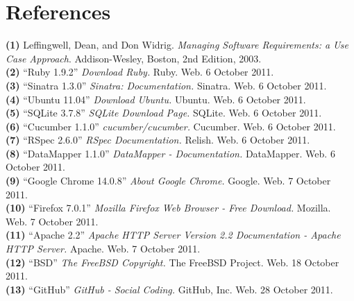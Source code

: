 \documentclass{article}
\begin{document}
\section{References}
\hangindent=1.4cm
\textbf{(1)} Leffingwell, Dean, and Don Widrig.
\emph{Managing Software Requirements: a Use Case Approach}.
Addison-Wesley, Boston,
2nd Edition,
2003.\\

\noindent\hangindent=1.4cm
\textbf{(2)} ``Ruby 1.9.2''
\emph{Download Ruby.} Ruby. Web.  6 October 2011. \\

\noindent\hangindent=1.4cm
\textbf{(3)} ``Sinatra 1.3.0''
\emph{Sinatra: Documentation.} Sinatra. Web.  6 October 2011.\\

\noindent\hangindent=1.4cm
\textbf{(4)} ``Ubuntu 11.04''
\emph{Download Ubuntu.} Ubuntu. Web.  6 October 2011.\\

\noindent\hangindent=1.4cm
\textbf{(5)} ``SQLite 3.7.8''
\emph{SQLite Download Page.} SQLite. Web.  6 October 2011.\\

\noindent\hangindent=1.4cm
\textbf{(6)} ``Cucumber 1.1.0''
\emph{cucumber/cucumber.} Cucumber. Web.  6 October 2011.\\

\noindent\hangindent=1.4cm
\textbf{(7)} ``RSpec 2.6.0''
\emph{RSpec Documentation.} Relish. Web.  6 October 2011.\\

\noindent\hangindent=1.4cm
\textbf{(8)} ``DataMapper 1.1.0''
\emph{DataMapper - Documentation.} DataMapper. Web.  6 October 2011.\\

\noindent\hangindent=1.4cm
\textbf{(9)} ``Google Chrome 14.0.8'' 
\emph{About Google Chrome.} Google. Web.  7 October 2011.\\

\noindent\hangindent=1.4cm
\textbf{(10)} ``Firefox 7.0.1''
\emph{Mozilla Firefox Web Browser - Free Download.} Mozilla. Web.  7 October 2011.\\

\noindent\hangindent=1.4cm
\textbf{(11)} ``Apache 2.2''
\emph{Apache HTTP Server Version 2.2 Documentation - Apache HTTP Server.} Apache. Web.  7 October 2011.\\

\noindent\hangindent=1.4cm
\textbf{(12)} ``BSD''
\emph{The FreeBSD Copyright.} The FreeBSD Project. Web. 18 October 2011.\\

\noindent\hangindent=1.4cm
\textbf{(13)} ``GitHub''
\emph{GitHub - Social Coding.} GitHub, Inc. Web. 28 October 2011.\\
\end{document}
